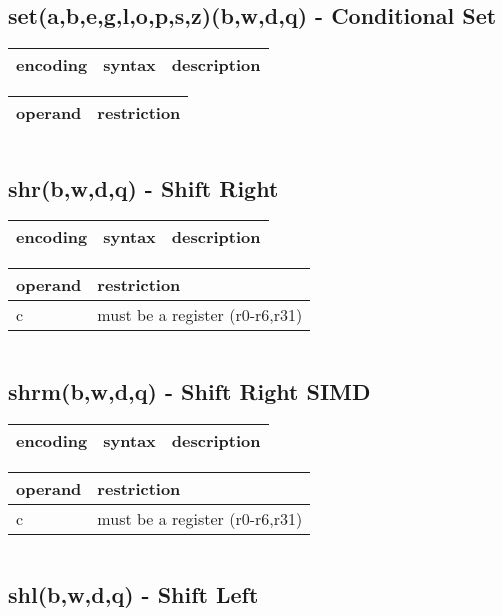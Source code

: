 \documentclass[letterpaper,10pt,openright,twoside,onecolumn]{book}
\begin{document}
\newpage\subsection{set(a,b,e,g,l,o,p,s,z)(b,w,d,q) - Conditional Set}
  \begin{tabular}{|l|l|l|}
   \hline
    encoding & syntax & description \\
   \hline
   \hline
  \end{tabular}
  \flushleft
  \begin{tabular}{|l|l|}
   \hline
    operand & restriction \\
   \hline
   \hline
  \end{tabular}
  \begin{verbatim}
  \end{verbatim}
\newpage\subsection{shr(b,w,d,q) - Shift Right}
  \begin{tabular}{|l|l|l|}
   \hline
    encoding & syntax & description \\
   \hline
   \hline
  \end{tabular}
  \flushleft
  \begin{tabular}{|l|l|}
   \hline
    operand & restriction \\
   \hline
    c & must be a register (r0-r6,r31) \\
   \hline
  \end{tabular}
  \begin{verbatim}
  \end{verbatim}
\newpage\subsection{shrm(b,w,d,q) - Shift Right SIMD}
  \begin{tabular}{|l|l|l|}
   \hline
    encoding & syntax & description \\
   \hline
   \hline
  \end{tabular}
  \flushleft
  \begin{tabular}{|l|l|}
   \hline
    operand & restriction \\
   \hline
    c & must be a register (r0-r6,r31) \\
   \hline
  \end{tabular}
  \begin{verbatim}
  \end{verbatim}
\newpage\subsection{shl(b,w,d,q) - Shift Left}
\end{document}
